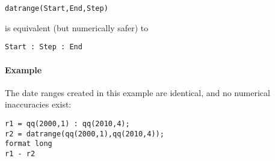 \begin{verbatim}
datrange(Start,End,Step)
\end{verbatim}

is equivalent (but numerically safer) to

\begin{verbatim}
Start : Step : End
\end{verbatim}

\paragraph{Example}\label{example}

The date ranges created in this example are identical, and no numerical
inaccuracies exist:

\begin{verbatim}
r1 = qq(2000,1) : qq(2010,4);
r2 = datrange(qq(2000,1),qq(2010,4));
format long
r1 - r2
\end{verbatim}


